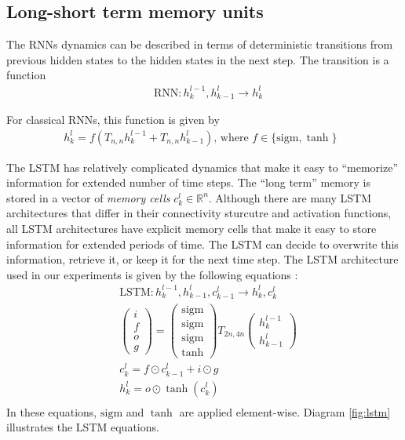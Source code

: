 \documentclass{article}
\begin{document}
\subsection{Long-short term memory units}
\label{sec:lstm}

The RNNs dynamics can be described in terms of deterministic transitions
from previous hidden states to the hidden states in the next step. 
The transition is a function
\begin{align*}
  &\text{RNN} : h^{l-1}_k, h^l_{k-1} \rightarrow h^l_k
\end{align*}

For classical RNNs, this function is given by
\begin{align*}
  h^l_k = f(T_{n,n}h^{l-1}_k + T_{n,n}h^l_{k-1}) \text{, where $f \in \{\mathrm{sigm}, \tanh\}$ }
\end{align*}

The LSTM has relatively complicated dynamics that make it easy to
``memorize'' information for extended number of time steps.  The
``long term'' memory is stored in a vector of \emph{memory cells}
$c^l_k \in \mathbb{R}^n$.  Although there are many LSTM architectures
that differ in their connectivity sturcutre and activation functions,
all LSTM architectures have explicit memory cells that make it easy to
store information for extended periods of time.  The LSTM can decide
to overwrite this information, retrieve it, or keep it for the next time
step.  The LSTM architecture used in our experiments is given by the
following equations \cite{graves2013speech}:
\begin{align*}
&\text{LSTM} : h^{l-1}_k, h^l_{k-1}, c^l_{k - 1} \rightarrow h^l_k, c^l_k\\
&\begin{pmatrix}i\\f\\o\\g\end{pmatrix} =
  \begin{pmatrix}\mathrm{sigm}\\\mathrm{sigm}\\\mathrm{sigm}\\\tanh\end{pmatrix}
  T_{2n,4n}\begin{pmatrix}h^{l - 1}_k\\h^l_{k-1}\end{pmatrix}\\
&c^l_k = f \odot c^l_{k-1} + i \odot g\\
&h^l_k = o \odot \tanh(c^l_k)\\
\end{align*}
In these equations, $\mathrm{sigm}$ and $\tanh$ are applied
element-wise. Diagram \ref{fig:lstm} illustrates the LSTM
equations.
\end{document}
